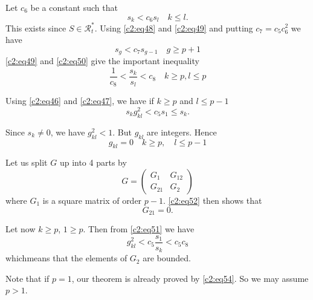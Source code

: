 Let $c_{6}$ be a constant such that
\begin{equation*}
s_{k}<c_{6}s_{l}\quad k\leq l.\tag{49}\label{c2:eq49}
\end{equation*}
This exists since $S\in\mathscr{R}^{\ast}_{t}$. Using \eqref{c2:eq48} and
\eqref{c2:eq49} and putting $c_{7}=c_{5}c^{2}_{6}$ we have
\begin{equation*}
s_{g}<c_{7}s_{g-1}\quad g\geq p+1\tag{50}\label{c2:eq50}
\end{equation*}
\eqref{c2:eq49} and \eqref{c2:eq50} give the important inequality
\begin{equation*}
\frac{1}{c_{8}}<\frac{s_{k}}{s_{l}}<c_{8}\quad k\geq p,l\leq
p\tag{51}\label{c2:eq51} 
\end{equation*}

Using \eqref{c2:eq46} and \eqref{c2:eq47}, we have if $k\geq p$ and $l\leq p-1$
$$
s_{k}g^{2}_{kl}<c_{5}s_{1}\leq s_{k}.
$$

Since $s_{k}\neq 0$, we have $g^{2}_{kl}<1$. But $g_{kl}$ are
integers. Hence
\begin{equation*}
g_{kl}=0\quad k\geq p, \quad l\leq p-1\tag{52}\label{c2:eq52}
\end{equation*}

Let us split $G$ up into 4 parts by
$$
G=
\begin{pmatrix}
G_{1} & G_{12}\\
G_{21} & G_{2}
\end{pmatrix}
$$
where $G_{1}$ is a square matrix of order $p-1$. \eqref{c2:eq52} then shows
that
\begin{equation*}
G_{21}=0.\tag{53}\label{c2:eq53}
\end{equation*}

Let now $k\geq p$, $1\geq p$. Then from \eqref{c2:eq51} we have
\begin{equation*}
g^{2}_{kl}<c_{5}\frac{s_{1}}{s_{k}}<c_{5}c_{8}\tag{54}\label{c2:eq54}
\end{equation*}
which\pageoriginale means that the elements of $G_{2}$ are bounded.

Note that if $p=1$, our theorem is already proved by \eqref{c2:eq54}. So we
may assume $p>1$.

